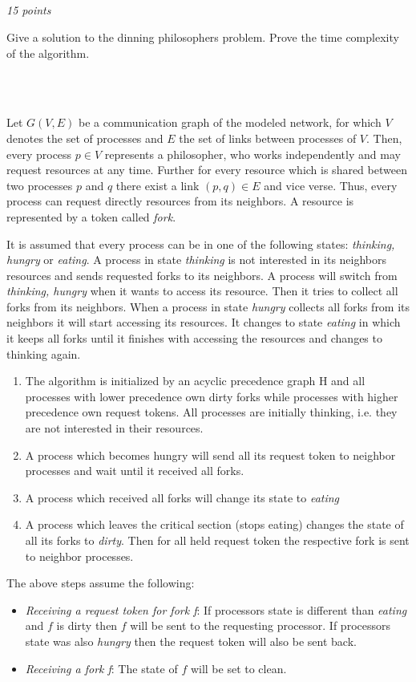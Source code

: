 \documentclass[a4paper]{article}
\newcommand{\points}[1]{\subsection{} \textit{#1 points}\\}
\newcommand{\question}[2][]{
  \parbox[t]{\textwidth}{
    \ifthenelse{\equal{#1}{}}{}{#1)}
    \parbox[t]{0.95\textwidth}{#2}}\\}
\begin{document}
\points{15}
\question{
  Give a solution to the dinning philosophers problem. Prove the time
  complexity of the algorithm.
}\\
%
\begin{lrbox}{\userinput}
  \begin{minipage}{\linewidth}
    Let $G(V,E)$ be a communication graph of the modeled network, for
    which $V$ denotes the set of processes and $E$ the set of links
    between processes of $V$. Then, every process $p \in V$ represents a
    philosopher, who works independently and may request resources at any
    time. Further for every resource which is shared between two processes
    $p$ and $q$ there exist a link $(p,q) \in E$ and vice verse. Thus,
    every process can request directly resources from its neighbors. A
    resource is represented by a token called \textit{fork}.

    It is assumed that every process can be in one of the following
    states: \textit{thinking, hungry} or \textit{eating}. A process in
    state \textit{thinking} is not interested in its neighbors resources
    and sends requested forks to its neighbors. A process will switch from
    \textit{thinking, hungry} when it wants to access its resource. Then
    it tries to collect all forks from its neighbors. When a process in
    state \textit{hungry} collects all forks from its neighbors it will
    start accessing its resources.  It changes to state \textit{eating} in
    which it keeps all forks until it finishes with accessing the
    resources and changes to thinking again.
    \begin{enumerate}
      \item The algorithm is initialized by an acyclic precedence
        graph H and all processes with lower precedence own dirty forks while
        processes with higher precedence own request tokens. All processes are
        initially thinking, i.e. they are not interested in their resources.
      \item A process which becomes hungry will send all its request
        token to neighbor processes and wait until it received all forks.
      \item A process which received all forks will change its state
        to \textit{eating}
      \item A process which leaves the critical section (stops eating)
        changes the state of all its forks to \textit{dirty}. Then for all
        held request token the respective fork is sent to neighbor processes.
    \end{enumerate}
    The above steps assume the following:
    \begin{itemize}
      \item \textit{Receiving a request token for fork f}: If
        processors state is different than \textit{eating} and $f$ is dirty
        then $f$ will be sent to the requesting processor.  If processors
        state was also \textit{hungry} then the request token will also be
        sent back.
      \item \textit{Receiving a fork f}: The state of $f$ will be
        set to clean.
    \end{itemize}
  \end{minipage}
\end{lrbox}
\end{document}
